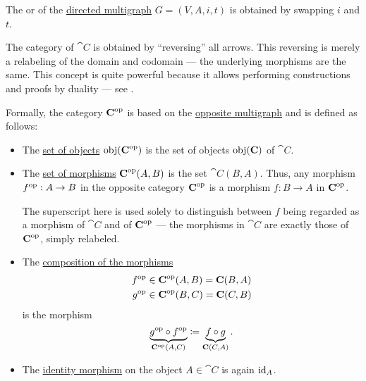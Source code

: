 \begin{definition}\label{def:opposite_directed_multigraph}
  The  or  of the \hyperref[def:directed_multigraph]{directed multigraph} \( G = (V, A, i, t) \) is obtained by swapping \( i \) and \( t \).
\end{definition}

\begin{definition}\label{def:opposite_category}
  The  category of \( \cat{C} \) is obtained by \enquote{reversing} all arrows. This reversing is merely a relabeling of the domain and codomain --- the underlying morphisms are the same. This concept is quite powerful because it allows performing constructions and proofs by duality --- see .

  Formally, the category \( \operatorname{\mathbf{C}}^{\operatorname{op}} \) is based on the \hyperref[def:opposite_directed_multigraph]{opposite multigraph} and is defined as follows:
  \begin{itemize}
    \item The \hyperref[def:category/objects]{set of objects} \( \operatorname{obj}(\operatorname{\mathbf{C}}^{\operatorname{op}}) \) is the set of objects \( \operatorname{obj}(\operatorname{\mathbf{C}}) \) of \( \cat{C} \).

    \item The \hyperref[def:category/morphisms]{set of morphisms} \( \operatorname{\mathbf{C}}^{\operatorname{op}}(A, B) \) is the set \( \cat{C}(B, A) \). Thus, any morphism \( f^{\operatorname{op}}: A \to B \) in the opposite category \( \operatorname{\mathbf{C}}^{\operatorname{op}} \) is a morphism \( f: B \to A \) in \( \operatorname{\mathbf{C}}^{\operatorname{op}} \).

    The superscript here is used solely to distinguish between \( f \) being regarded as a morphism of \( \cat{C} \) and of \( \operatorname{\mathbf{C}}^{\operatorname{op}} \) --- the morphisms in \( \cat{C} \) are exactly those of \( \operatorname{\mathbf{C}}^{\operatorname{op}} \), simply relabeled.

    \item The \hyperref[def:category/composition]{composition of the morphisms}
    \begin{align*}
      f^{\operatorname{op}} &\in \operatorname{\mathbf{C}}^{\operatorname{op}}(A, B) = \operatorname{\mathbf{C}}(B, A) \\
      g^{\operatorname{op}} &\in \operatorname{\mathbf{C}}^{\operatorname{op}}(B, C) = \operatorname{\mathbf{C}}(C, B)
    \end{align*}
    is the morphism
    \begin{equation*}
      \underbrace{g^{\opcat} \bincirc f^{\opcat}}_{\cat{C}^{\opcat}(A, C)} \coloneqq \underbrace{f \bincirc g}_{\cat{C}(C, A)}.
    \end{equation*}

    \item The \hyperref[def:category/identity]{identity morphism} on the object \( A \in \cat{C} \) is again \( \operatorname{id}_A \).
  \end{itemize}
\end{definition}

